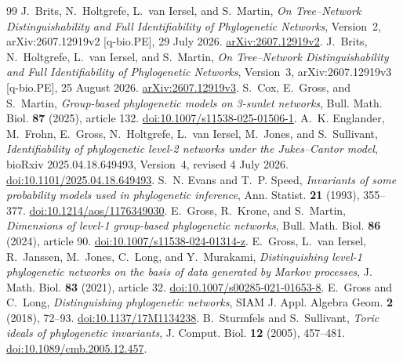 \documentclass[11pt]{article}
\theoremstyle{remark}\newtheorem{remark}[theorem]{Remark}
\begin{document}
\begin{thebibliography}{99}
J.~Brits, N.~Holtgrefe, L.~van Iersel, and S.~Martin, \emph{On Tree--Network Distinguishability and Full Identifiability of Phylogenetic Networks}, Version~2, arXiv:2607.12919v2 [q-bio.PE], 29 July 2026. \href{https://arxiv.org/abs/2607.12919v2}{arXiv:2607.12919v2}.
J.~Brits, N.~Holtgrefe, L.~van Iersel, and S.~Martin, \emph{On Tree--Network Distinguishability and Full Identifiability of Phylogenetic Networks}, Version~3, arXiv:2607.12919v3 [q-bio.PE], 25 August 2026. \href{https://arxiv.org/abs/2607.12919v3}{arXiv:2607.12919v3}.
S.~Cox, E.~Gross, and S.~Martin, \emph{Group-based phylogenetic models on 3-sunlet networks}, Bull. Math. Biol. \textbf{87} (2025), article 132. \href{https://doi.org/10.1007/s11538-025-01506-1}{doi:10.1007/s11538-025-01506-1}.
A.~K. Englander, M.~Frohn, E.~Gross, N.~Holtgrefe, L.~van Iersel, M.~Jones, and S.~Sullivant, \emph{Identifiability of phylogenetic level-2 networks under the Jukes--Cantor model}, bioRxiv 2025.04.18.649493, Version~4, revised 4 July 2026. \href{https://doi.org/10.1101/2025.04.18.649493}{doi:10.1101/2025.04.18.649493}.
S.~N. Evans and T.~P. Speed, \emph{Invariants of some probability models used in phylogenetic inference}, Ann. Statist. \textbf{21} (1993), 355--377. \href{https://doi.org/10.1214/aos/1176349030}{doi:10.1214/aos/1176349030}.
E.~Gross, R.~Krone, and S.~Martin, \emph{Dimensions of level-1 group-based phylogenetic networks}, Bull. Math. Biol. \textbf{86} (2024), article 90. \href{https://doi.org/10.1007/s11538-024-01314-z}{doi:10.1007/s11538-024-01314-z}.
E.~Gross, L.~van Iersel, R.~Janssen, M.~Jones, C.~Long, and Y.~Murakami, \emph{Distinguishing level-1 phylogenetic networks on the basis of data generated by Markov processes}, J. Math. Biol. \textbf{83} (2021), article 32. \href{https://doi.org/10.1007/s00285-021-01653-8}{doi:10.1007/s00285-021-01653-8}.
E.~Gross and C.~Long, \emph{Distinguishing phylogenetic networks}, SIAM J. Appl. Algebra Geom. \textbf{2} (2018), 72--93. \href{https://doi.org/10.1137/17M1134238}{doi:10.1137/17M1134238}.
B.~Sturmfels and S.~Sullivant, \emph{Toric ideals of phylogenetic invariants}, J. Comput. Biol. \textbf{12} (2005), 457--481. \href{https://doi.org/10.1089/cmb.2005.12.457}{doi:10.1089/cmb.2005.12.457}.
\end{thebibliography}
\end{document}
